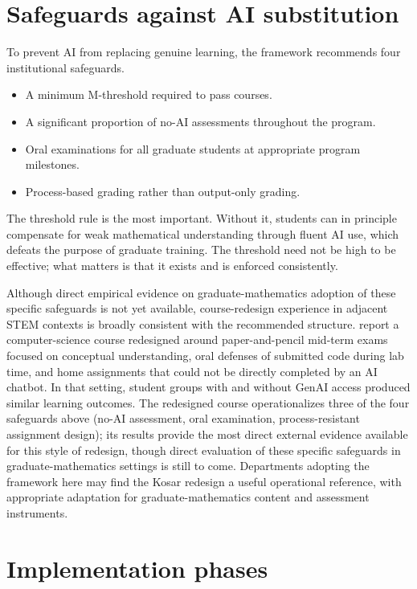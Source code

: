 \documentclass{SIAMbook2023}
\begin{document}
\section{Safeguards against AI substitution}
\label{app:mae-safeguards}%

To prevent AI from replacing genuine learning, the framework recommends four institutional safeguards.

\begin{itemize}
\item A minimum M-threshold required to pass courses.
\item A significant proportion of no-AI assessments throughout the program.
\item Oral examinations for all graduate students at appropriate program milestones.
\item Process-based grading rather than output-only grading.
\end{itemize}

The threshold rule is the most important. Without it, students can in principle compensate for weak mathematical understanding through fluent AI use, which defeats the purpose of graduate training. The threshold need not be high to be effective; what matters is that it exists and is enforced consistently.

Although direct empirical evidence on graduate-mathematics adoption of these specific safeguards is not yet available, course-redesign experience in adjacent STEM contexts is broadly consistent with the recommended structure. \citet{kosar2024computer} report a computer-science course redesigned around paper-and-pencil mid-term exams focused on conceptual understanding, oral defenses of submitted code during lab time, and home assignments that could not be directly completed by an AI chatbot. In that setting, student groups with and without GenAI access produced similar learning outcomes. The redesigned course operationalizes three of the four safeguards above (no-AI assessment, oral examination, process-resistant assignment design); its results provide the most direct external evidence available for this style of redesign, though direct evaluation of these specific safeguards in graduate-mathematics settings is still to come. Departments adopting the framework here may find the Kosar redesign a useful operational reference, with appropriate adaptation for graduate-mathematics content and assessment instruments.

\section{Implementation phases}
\end{document}
